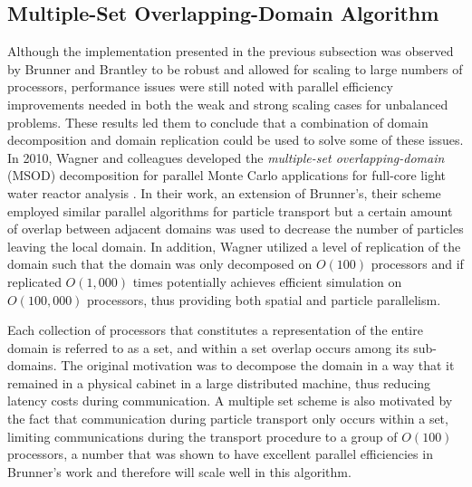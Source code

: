 \documentclass[letterpaper,11pt]{article}
\begin{document}
\subsection{Multiple-Set Overlapping-Domain Algorithm}
\label{subsubsec:msod}
Although the implementation presented in the previous subsection was
observed by Brunner and Brantley to be robust and allowed for scaling
to large numbers of processors, performance issues were still noted
with parallel efficiency improvements needed in both the weak and
strong scaling cases for unbalanced problems. These results led them
to conclude that a combination of domain decomposition and domain
replication could be used to solve some of these issues. In 2010,
Wagner and colleagues developed the \textit{multiple-set
  overlapping-domain} (MSOD) decomposition for parallel Monte Carlo
applications for full-core light water reactor analysis
\cite{wagner_hybrid_2010}. In their work, an extension of Brunner's,
their scheme employed similar parallel algorithms for particle
transport but a certain amount of overlap between adjacent domains was
used to decrease the number of particles leaving the local domain. In
addition, Wagner utilized a level of replication of the domain such
that the domain was only decomposed on $O(100)$ processors and if
replicated $O(1,000)$ times potentially achieves efficient simulation
on $O(100,000)$ processors, thus providing both spatial and particle
parallelism.

Each collection of processors that constitutes a representation of the
entire domain is referred to as a set, and within a set overlap occurs
among its sub-domains. The original motivation was to decompose the
domain in a way that it remained in a physical cabinet in a large
distributed machine, thus reducing latency costs during
communication. A multiple set scheme is also motivated by the fact
that communication during particle transport only occurs within a set,
limiting communications during the transport procedure to a group of
$O(100)$ processors, a number that was shown to have excellent
parallel efficiencies in Brunner's work and therefore will scale well
in this algorithm.
\end{document}
